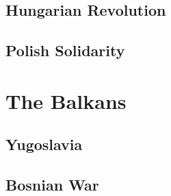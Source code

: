 \subsection*{Hungarian Revolution}

\subsection*{Polish Solidarity}

\section{The Balkans}

\subsection*{Yugoslavia}

\subsection*{Bosnian War}

